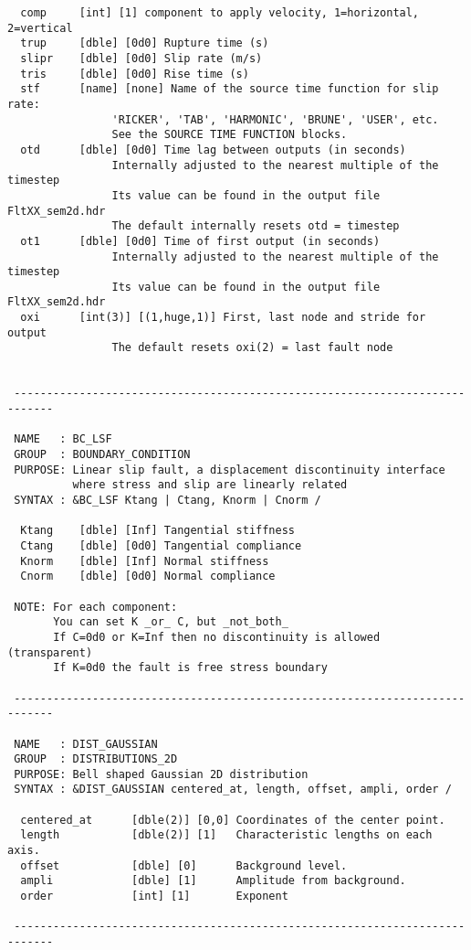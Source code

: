 \begin{verbatim}
  comp     [int] [1] component to apply velocity, 1=horizontal, 2=vertical
  trup     [dble] [0d0] Rupture time (s)
  slipr    [dble] [0d0] Slip rate (m/s)
  tris     [dble] [0d0] Rise time (s)
  stf      [name] [none] Name of the source time function for slip rate:
                'RICKER', 'TAB', 'HARMONIC', 'BRUNE', 'USER', etc.
                See the SOURCE TIME FUNCTION blocks.
  otd      [dble] [0d0] Time lag between outputs (in seconds)
                Internally adjusted to the nearest multiple of the timestep
                Its value can be found in the output file FltXX_sem2d.hdr
                The default internally resets otd = timestep
  ot1      [dble] [0d0] Time of first output (in seconds)
                Internally adjusted to the nearest multiple of the timestep
                Its value can be found in the output file FltXX_sem2d.hdr
  oxi      [int(3)] [(1,huge,1)] First, last node and stride for output
                The default resets oxi(2) = last fault node
 

 ----------------------------------------------------------------------------

 NAME   : BC_LSF 
 GROUP  : BOUNDARY_CONDITION
 PURPOSE: Linear slip fault, a displacement discontinuity interface
          where stress and slip are linearly related
 SYNTAX : &BC_LSF Ktang | Ctang, Knorm | Cnorm /

  Ktang    [dble] [Inf] Tangential stiffness
  Ctang    [dble] [0d0] Tangential compliance
  Knorm    [dble] [Inf] Normal stiffness
  Cnorm    [dble] [0d0] Normal compliance

 NOTE: For each component:
       You can set K _or_ C, but _not_both_
       If C=0d0 or K=Inf then no discontinuity is allowed (transparent)
       If K=0d0 the fault is free stress boundary

 ----------------------------------------------------------------------------

 NAME   : DIST_GAUSSIAN
 GROUP  : DISTRIBUTIONS_2D
 PURPOSE: Bell shaped Gaussian 2D distribution 
 SYNTAX : &DIST_GAUSSIAN centered_at, length, offset, ampli, order /

  centered_at      [dble(2)] [0,0] Coordinates of the center point.
  length           [dble(2)] [1]   Characteristic lengths on each axis.
  offset           [dble] [0]      Background level.    
  ampli            [dble] [1]      Amplitude from background.
  order            [int] [1]       Exponent

 ----------------------------------------------------------------------------


\end{verbatim}
